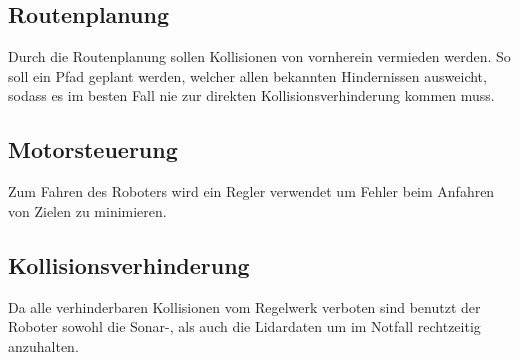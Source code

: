 \documentclass[12pt]{article}
\begin{document}
\subsection{Routenplanung}
Durch die Routenplanung sollen Kollisionen von vornherein vermieden werden. So soll ein Pfad geplant werden, welcher allen bekannten Hindernissen ausweicht, sodass es im besten Fall nie zur direkten Kollisionsverhinderung kommen muss.

\subsection{Motorsteuerung}
Zum Fahren des Roboters wird ein Regler verwendet um Fehler beim Anfahren von Zielen zu minimieren.

\subsection{Kollisionsverhinderung}
Da alle verhinderbaren Kollisionen vom Regelwerk verboten sind benutzt der Roboter sowohl die Sonar-, als auch die Lidardaten um im Notfall rechtzeitig anzuhalten.
\end{document}
